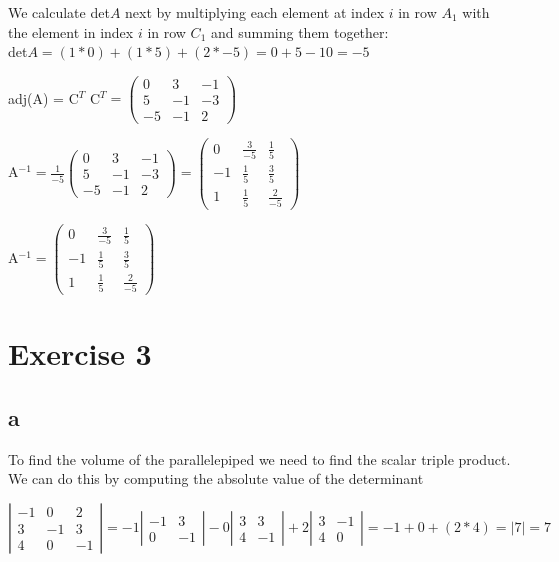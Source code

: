 \documentclass{article}
\begin{document}
We calculate det$A$ next by multiplying each element at index $i$ in row $A_{1}$ with the element in index $i$ in row $C_{1}$ and summing them together:\\
det$A = (1*0) + (1*5) + (2*-5) = 0 + 5 - 10 = -5$

adj(A) = C$^{T}$
C$^{T}=
\left (
    \begin{matrix}
        0 & 3 & -1\\
        5 & -1 & -3\\
        -5 & -1 & 2
    \end{matrix}
\right )
$

A$^{-1} = \frac{1}{-5}
\left (
    \begin{matrix}
        0 & 3 & -1\\
        5 & -1 & -3\\
        -5 & -1 & 2
    \end{matrix}
\right )       
=
\left (
    \begin{matrix}
        0 & \frac{3}{-5} & \frac{1}{5}\\
        -1 & \frac{1}{5} & \frac{3}{5}\\
        1 & \frac{1}{5} & \frac{2}{-5}
    \end{matrix}
\right )
$

A$^{-1} =
\left (
    \begin{matrix}
        0 & \frac{3}{-5} & \frac{1}{5}\\
        -1 & \frac{1}{5} & \frac{3}{5}\\
        1 & \frac{1}{5} & \frac{2}{-5}
    \end{matrix}
\right )
$
\newpage

\section*{Exercise 3}

\subsection*{a}

To find the volume of the parallelepiped we need to find the scalar triple product. We can do this by computing the absolute value of the determinant

$
\left |
    \begin{matrix}
        -1 & 0 & 2\\
        3 & -1 & 3\\
        4 & 0 & -1
    \end{matrix}
\right |
=-1
\left |
    \begin{matrix}
        -1 & 3\\
        0 & -1
    \end{matrix}
\right |
-0
\left |
    \begin{matrix}
        3 & 3\\
        4 & -1
    \end{matrix}
\right |
+2
\left |
    \begin{matrix}
        3 & -1\\
        4 & 0
    \end{matrix}
\right |
=
-1 + 0 + (2*4)
=
|7| = 7
$
\end{document}
